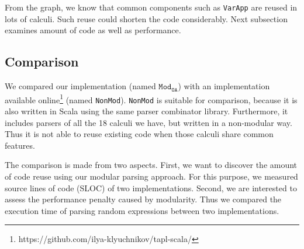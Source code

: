 




From the graph, we know that common components such as \lstinline{VarApp} are reused in
lots of calculi. Such reuse could shorten the code considerably.
Next subsection examines amount of code as well as performance.

\subsection{Comparison}\label{subsec:cs-comparison}

\newcommand\ourimpl{$\texttt{Mod}_{\texttt{OA}}$}
\newcommand\ilyaimpl{\texttt{NonMod}}
\newcommand\ourclass{$\texttt{Mod}_{\texttt{CLASS}}$}
\newcommand\ilyalongest{$\texttt{NonMod}_{\texttt{|||}}$}

We compared our implementation (named \ourimpl{}) with an implementation
available online\footnote{https://github.com/ilya-klyuchnikov/tapl-scala/} (named \ilyaimpl{}).
\ilyaimpl{} is suitable for comparison, because it is also
written in Scala using the same parser combinator library.
Furthermore, it includes parsers of all the 18 calculi we have, but
written in a non-modular way. Thus it is not able to reuse existing
code when those calculi share common features.

The comparison is made from two aspects. First, we want to discover
the amount of code reuse using our modular parsing approach.
For this purpose, we measured source lines of code (SLOC) of two implementations.
Second, we are interested to assess the performance penalty caused by modularity.
Thus we compared the execution time of parsing random expressions between two implementations.


